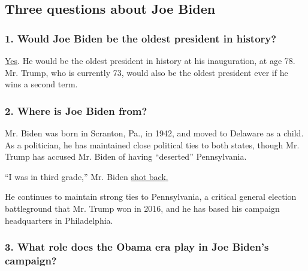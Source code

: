 \hypertarget{three-questions-about-joe-biden}{%
\subsection{Three questions about Joe
Biden}\label{three-questions-about-joe-biden}}

\hypertarget{1-would-joe-biden-be-the-oldest-president-in-history}{%
\subsubsection{\texorpdfstring{\textbf{1. Would Joe Biden be the oldest
president in
history?}}{1. Would Joe Biden be the oldest president in history?}}\label{1-would-joe-biden-be-the-oldest-president-in-history}}

\href{https://www.nytimes3xbfgragh.onion/2019/07/29/us/politics/joe-biden-age.html}{Yes}.
He would be the oldest president in history at his inauguration, at age
78. Mr. Trump, who is currently 73, would also be the oldest president
ever if he wins a second term.

\hypertarget{2-where-is-joe-biden-from}{%
\subsubsection{\texorpdfstring{\textbf{2. Where is Joe Biden
from?}}{2. Where is Joe Biden from?}}\label{2-where-is-joe-biden-from}}

Mr. Biden was born in Scranton, Pa., in 1942, and moved to Delaware as a
child. As a politician, he has maintained close political ties to both
states, though Mr. Trump has accused Mr. Biden of having ``deserted''
Pennsylvania.

``I was in third grade,'' Mr. Biden
\href{https://www.nytimes3xbfgragh.onion/2019/05/28/us/politics/trump-biden-north-korea.html}{shot
back}\href{https://www.nytimes3xbfgragh.onion/2019/05/28/us/politics/trump-biden-north-korea.html}{.}

He continues to maintain strong ties to Pennsylvania, a critical general
election battleground that Mr. Trump won in 2016, and he has based his
campaign headquarters in Philadelphia.

\hypertarget{3-what-role-does-the-obama-era-play-in-joe-bidens-campaign}{%
\subsubsection{\texorpdfstring{\textbf{3. What role does the Obama era
play in Joe Biden's
campaign?}}{3. What role does the Obama era play in Joe Biden's campaign?}}\label{3-what-role-does-the-obama-era-play-in-joe-bidens-campaign}}

